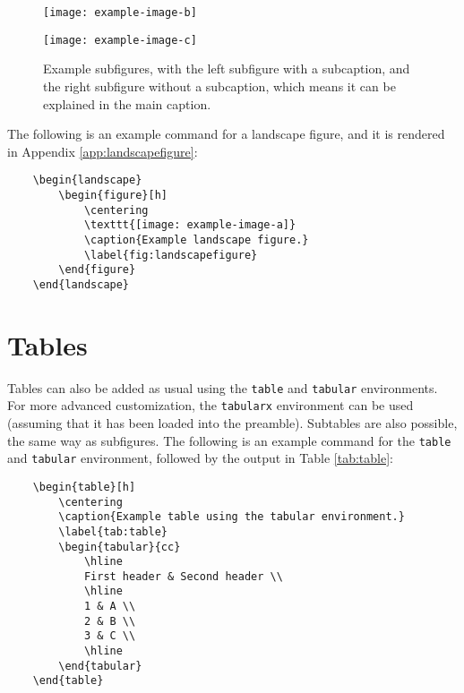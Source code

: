 \documentclass{umalayathesis}
\begin{document}
\begin{figure}[h]
    \centering
    \begin{minipage}{0.48\textwidth}
        \centering
        \texttt{[image: example-image-b]}
    \end{minipage}%
    \begin{minipage}{0.48\textwidth}
        \centering
        \texttt{[image: example-image-c]}
        \subcaption{}
    \end{minipage}
    \caption{Example subfigures, with the left subfigure with a subcaption, and the right subfigure without a subcaption, which means it can be explained in the main caption.}
    \label{fig:subfigures}
\end{figure}

The following is an example command for a landscape figure, and it is rendered in Appendix \ref{app:landscapefigure}:

\begin{verbatim}
    \begin{landscape}
        \begin{figure}[h]
            \centering
            \texttt{[image: example-image-a]}
            \caption{Example landscape figure.}
            \label{fig:landscapefigure}
        \end{figure}
    \end{landscape}
\end{verbatim}

\section{Tables}

Tables can also be added as usual using the \texttt{table} and \texttt{tabular} environments. For more advanced customization, the \texttt{tabularx} environment can be used (assuming that it has been loaded into the preamble). Subtables are also possible, the same way as subfigures. The following is an example command for the \texttt{table} and \texttt{tabular} environment, followed by the output in Table \ref{tab:table}:

\begin{verbatim}
    \begin{table}[h]
        \centering
        \caption{Example table using the tabular environment.}
        \label{tab:table}
        \begin{tabular}{cc}
            \hline
            First header & Second header \\
            \hline
            1 & A \\
            2 & B \\
            3 & C \\
            \hline
        \end{tabular}
    \end{table}
\end{verbatim}
\end{document}
